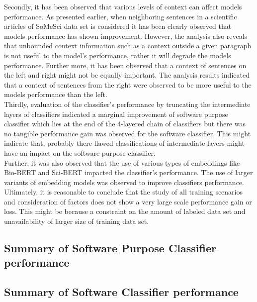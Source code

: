 Secondly, it has been observed that various levels of context can affect models performance. As presented earlier, when neighboring sentences in a scientific articles of SoMeSci data set is considered it has been clearly observed that models performance has shown improvement. However, the analysis also reveals that unbounded context information such as a context outside a given paragraph is not useful to the model’s performance, rather it will degrade the models performance. Further more, it has been observed that a context of sentences on the left and right might not be equally important. The analysis results indicated that a context of sentences from the right were observed to be more useful to the models performance than the left. \\

Thirdly, evaluation of the classifier’s performance by truncating the intermediate layers of classifiers indicated a marginal improvement of software purpose classifier which lies at the end of the 4-layered chain of classifiers but there was no tangible performance gain was observed for the software classifier. This might indicate that, probably there flawed classifications of intermediate layers might have an impact on the software purpose classifier. \\

Further, it was also observed that the use of various types of embeddings like Bio-BERT and Sci-BERT impacted the classifier’s performance. The use of larger variants of embedding models was observed to improve classifiers performance. \\

Ultimately, it is reasonable to conclude that the study of all training scenarios and consideration of factors does not show a very large scale performance gain or loss. This might be because a constraint on the amount of labeled data set and unavailability of larger size of training data set. 



\subsection{Summary of Software Purpose Classifier performance}
\label{sec:chapter06:summary_softPurpose}

\subsection{Summary of Software Classifier performance}
\label{sec:chapter06:summary_soft}




















